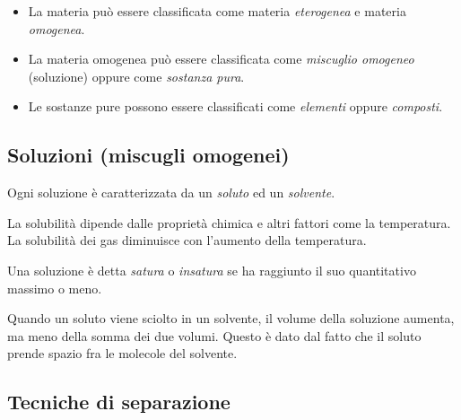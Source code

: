 \documentclass[a4paper]{article}
\begin{document}
\begin{itemize}
    \item La materia può essere classificata come materia \textit{eterogenea}
    e materia \textit{omogenea}.
    
    \item La materia omogenea può essere classificata come \textit{miscuglio omogeneo} (soluzione)
    oppure come \textit{sostanza pura}.
    
    \item Le sostanze pure possono essere classificati come \textit{elementi} oppure \textit{composti}.
\end{itemize}

\pagebreak

\subsection{Soluzioni (miscugli omogenei)}

Ogni soluzione è caratterizzata
da un \textit{soluto} ed un \textit{solvente}.

La solubilità dipende dalle proprietà chimica e altri fattori come la temperatura.
La solubilità dei gas diminuisce con l'aumento della temperatura.

Una soluzione è detta \textit{satura} o \textit{insatura}
se ha raggiunto il suo quantitativo massimo o meno.

Quando un soluto viene sciolto in un solvente, il volume della soluzione aumenta,
ma meno della somma dei due volumi. Questo è dato dal fatto che il soluto prende spazio fra le molecole del solvente.

\subsection{Tecniche di separazione}



\end{document}

